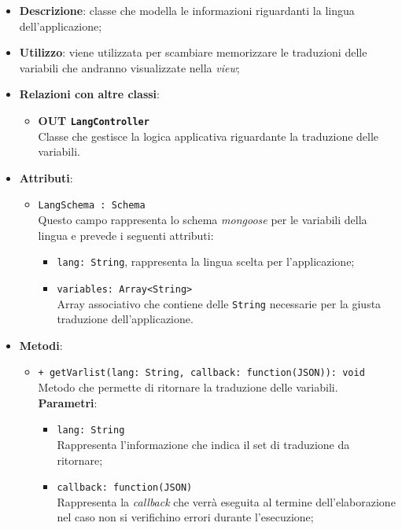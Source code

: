 	\begin{itemize}
		\item \textbf{Descrizione}: classe che modella le informazioni riguardanti la lingua dell'applicazione;
		\item \textbf{Utilizzo}: viene utilizzata per scambiare memorizzare le traduzioni delle variabili che andranno visualizzate nella \textit{view};
		\item \textbf{Relazioni con altre classi}:
			\begin{itemize}
				\item \textbf{OUT \texttt{LangController}} \\
				Classe che gestisce la logica applicativa riguardante la traduzione delle variabili.
			\end{itemize}
		\item \textbf{Attributi}:
			\begin{itemize}
				\item \texttt{LangSchema : Schema} \\
				Questo campo rappresenta lo schema \textit{mongoose} per le variabili della lingua e prevede i seguenti attributi:
					\begin{itemize}
						\item \texttt{lang: String}, rappresenta la lingua scelta per l'applicazione;
						\item \texttt{variables: Array<String>}\\ Array associativo che contiene delle \texttt{String} necessarie per la giusta traduzione dell'applicazione.
					\end{itemize}
			\end{itemize}
		\item \textbf{Metodi}:
			\begin{itemize}
				\item \texttt{+ getVarlist(lang: String, callback: function(JSON)): void} \\
				Metodo che permette di ritornare la traduzione delle variabili. \\
				\textbf{Parametri}:
					\begin{itemize}
						\item \texttt{lang: String} \\
						Rappresenta l'informazione che indica il set di traduzione da ritornare;
						\item \texttt{callback: function(JSON)} \\
						Rappresenta la \textit{callback} che verrà eseguita al termine dell'elaborazione nel caso non si verifichino errori durante l'esecuzione;

\end{itemize}
\end{itemize}
\end{itemize}

